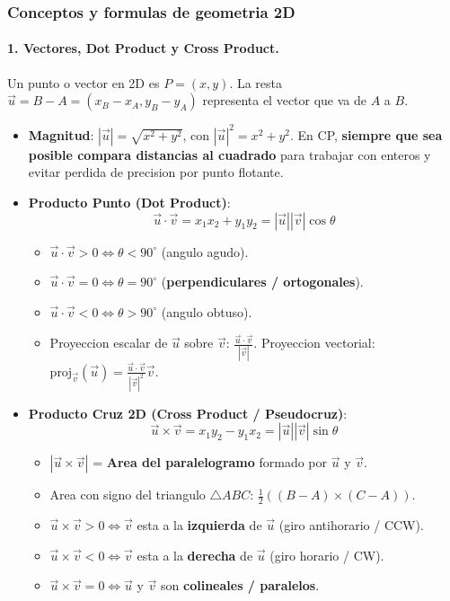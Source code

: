 \subsubsection{Conceptos y formulas de geometria 2D}


\paragraph{1. Vectores, Dot Product y Cross Product.}
Un punto o vector en 2D es $P = (x, y)$. La resta $\vec{u} = B - A = (x_B - x_A, y_B - y_A)$ representa el vector que va de $A$ a $B$.
\begin{itemize}\setlength\itemsep{0pt}
	\item \textbf{Magnitud}: $|\vec{u}| = \sqrt{x^2 + y^2}$, con $|\vec{u}|^2 = x^2 + y^2$. En CP, \textbf{siempre que sea posible compara distancias al cuadrado} para trabajar con enteros y evitar perdida de precision por punto flotante.
	\item \textbf{Producto Punto (Dot Product)}:
	\[
		\vec{u} \cdot \vec{v} = x_1 x_2 + y_1 y_2 = |\vec{u}||\vec{v}| \cos \theta
	\]
	\begin{itemize}\setlength\itemsep{0pt}
		\item $\vec{u} \cdot \vec{v} > 0 \iff \theta < 90^\circ$ (angulo agudo).
		\item $\vec{u} \cdot \vec{v} = 0 \iff \theta = 90^\circ$ (\textbf{perpendiculares / ortogonales}).
		\item $\vec{u} \cdot \vec{v} < 0 \iff \theta > 90^\circ$ (angulo obtuso).
		\item Proyeccion escalar de $\vec{u}$ sobre $\vec{v}$: $\frac{\vec{u} \cdot \vec{v}}{|\vec{v}|}$. Proyeccion vectorial: $\text{proj}_{\vec{v}}(\vec{u}) = \frac{\vec{u} \cdot \vec{v}}{|\vec{v}|^2} \vec{v}$.
	\end{itemize}
	\item \textbf{Producto Cruz 2D (Cross Product / Pseudocruz)}:
	\[
		\vec{u} \times \vec{v} = x_1 y_2 - y_1 x_2 = |\vec{u}||\vec{v}| \sin \theta
	\]
	\begin{itemize}\setlength\itemsep{0pt}
		\item $|\vec{u} \times \vec{v}|$ = \textbf{Area del paralelogramo} formado por $\vec{u}$ y $\vec{v}$.
		\item Area con signo del triangulo $\triangle ABC$: $\frac{1}{2}((B - A) \times (C - A))$.
		\item $\vec{u} \times \vec{v} > 0 \iff \vec{v}$ esta a la \textbf{izquierda} de $\vec{u}$ (giro antihorario / CCW).
		\item $\vec{u} \times \vec{v} < 0 \iff \vec{v}$ esta a la \textbf{derecha} de $\vec{u}$ (giro horario / CW).
		\item $\vec{u} \times \vec{v} = 0 \iff \vec{u}$ y $\vec{v}$ son \textbf{colineales / paralelos}.
	\end{itemize}
\end{itemize}

